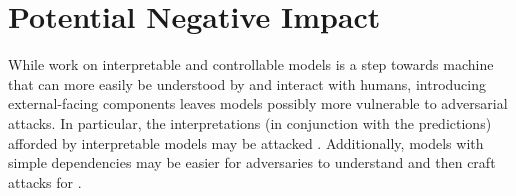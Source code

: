 \documentclass{article}
\begin{document}

\section{Potential Negative Impact}
\label{sec:impact}
While work on interpretable and controllable models is a step towards machine that can more easily be understood by and interact with humans, introducing external-facing components leaves models possibly more vulnerable to adversarial attacks. In particular, the interpretations (in conjunction with the predictions) afforded by interpretable models may be attacked \citep{adv-interp}. Additionally, models with simple dependencies may be easier for adversaries to understand and then craft attacks for \citep{Zhang2021LabelFA,adv-phmm}.
\end{document}
